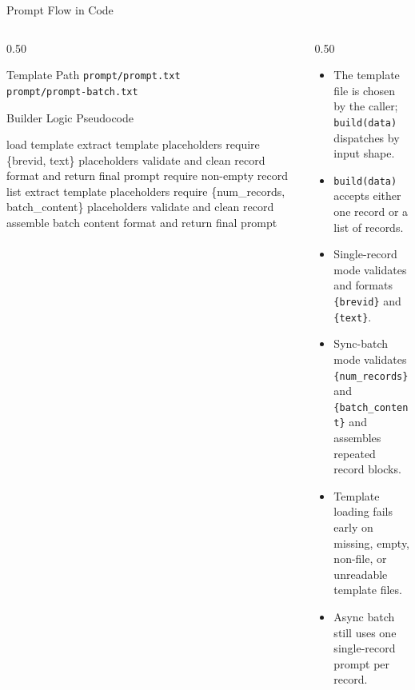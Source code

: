 \documentclass[
        11pt,
        compress,
        xcolor={dvipsnames}
    ]{beamer}
\begin{document}
\begin{frame}[shrink=12]{Prompt Flow in Code}
  \begin{columns}[T]
    \begin{column}{0.50\textwidth}
      \begin{block}{Template Path}
        \small
        \texttt{prompt/prompt.txt}\\
        \texttt{prompt/prompt-batch.txt}
      \end{block}
      \begin{block}{Builder Logic Pseudocode}
        \scriptsize
        \begin{algorithmic}
            \State load template
          \EndProcedure
          \Statex
              \State extract template placeholders
              \State require \{brevid, text\} placeholders
              \State validate and clean record
              \State format and return final prompt
            \Else
              \State require non-empty record list
              \State extract template placeholders
              \State require \{num\_records, batch\_content\} placeholders
                \State validate and clean record
              \EndFor
              \State assemble batch content
              \State format and return final prompt
            \EndIf
          \EndProcedure
        \end{algorithmic}
      \end{block}
    \end{column}
    \begin{column}{0.50\textwidth}
      \small
      \begin{itemize}
        \item The template file is chosen by the caller; \texttt{build(data)} dispatches by input shape.
        \item \texttt{build(data)} accepts either one record or a list of records.
        \item Single-record mode validates and formats \texttt{\{brevid\}} and \texttt{\{text\}}.
        \item Sync-batch mode validates \texttt{\{num\_records\}} and \texttt{\{batch\_content\}} and assembles repeated record blocks.
        \item Template loading fails early on missing, empty, non-file, or unreadable template files.
        \item Async batch still uses one single-record prompt per record.
      \end{itemize}
    \end{column}
  \end{columns}
\end{frame}
\end{document}
